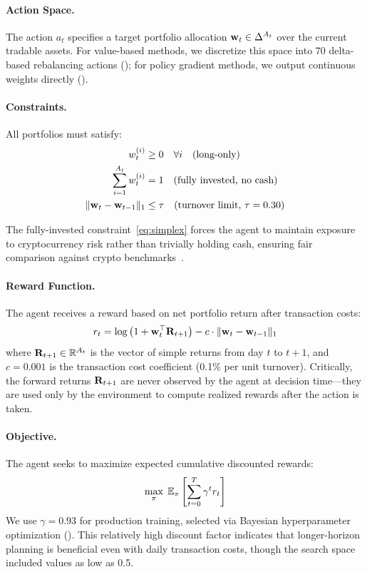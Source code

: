 \paragraph{Action Space.} The action $a_t$ specifies a target portfolio allocation $\mathbf{w}_t \in \Delta^{A_t}$ over the current tradable assets. For value-based methods, we discretize this space into 70 delta-based rebalancing actions (); for policy gradient methods, we output continuous weights directly ().

\paragraph{Constraints.} All portfolios must satisfy:
\begin{align}
    w_t^{(i)} &\geq 0 \quad \forall i \quad \text{(long-only)} \label{eq:long_only} \\
    \sum_{i=1}^{A_t} w_t^{(i)} &= 1 \quad \text{(fully invested, no cash)} \label{eq:simplex} \\
    \|\mathbf{w}_t - \mathbf{w}_{t-1}\|_1 &\leq \tau \quad \text{(turnover limit, } \tau = 0.30\text{)} \label{eq:turnover}
\end{align}

The fully-invested constraint~\eqref{eq:simplex} forces the agent to maintain exposure to cryptocurrency risk rather than trivially holding cash, ensuring fair comparison against crypto benchmarks~\citep{jiang2017eIIE, lucarelli2020dqlcrypto}.

\paragraph{Reward Function.} The agent receives a reward based on net portfolio return after transaction costs:
\begin{equation}
    r_t = \log\left(1 + \mathbf{w}_t^\top \mathbf{R}_{t+1}\right) - c \cdot \|\mathbf{w}_t - \mathbf{w}_{t-1}\|_1
    \label{eq:reward}
\end{equation}
where $\mathbf{R}_{t+1} \in \mathbb{R}^{A_t}$ is the vector of simple returns from day $t$ to $t+1$, and $c = 0.001$ is the transaction cost coefficient (0.1\% per unit turnover). Critically, the forward returns $\mathbf{R}_{t+1}$ are never observed by the agent at decision time---they are used only by the environment to compute realized rewards after the action is taken.

\paragraph{Objective.} The agent seeks to maximize expected cumulative discounted rewards:
\begin{equation}
    \max_\pi \; \operatorname{\mathbb{E}}_\pi \left[ \sum_{t=0}^{T} \gamma^t r_t \right]
\end{equation}
We use $\gamma = 0.93$ for production training, selected via Bayesian hyperparameter optimization (). This relatively high discount factor indicates that longer-horizon planning is beneficial even with daily transaction costs, though the search space included values as low as 0.5.

